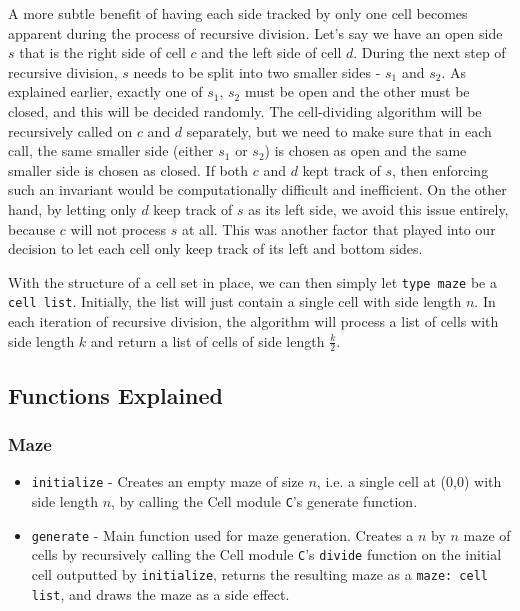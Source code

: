 \documentclass[11pt, margin=1in]{article}
\newcommand{\tab}{\par \qquad}
\begin{document}
A more subtle benefit of having each side tracked by only one cell becomes apparent during the process of recursive division.  Let's say we have an open side $s$ that is the right side of cell $c$ and the left side of cell $d$.  During the next step of recursive division, $s$ needs to be split into two smaller sides - $s_1$ and $s_2$.  As explained earlier, exactly one of $s_1$, $s_2$ must be open and the other must be closed, and this will be decided randomly.  The cell-dividing algorithm will be recursively called on $c$ and $d$ separately, but we need to make sure that in each call, the same smaller side (either $s_1$ or $s_2$) is chosen as open and the same smaller side is chosen as closed.  If both $c$ and $d$ kept track of $s$, then enforcing such an invariant would be computationally difficult and inefficient.  On the other hand, by letting only $d$ keep track of $s$ as its left side, we avoid this issue entirely, because $c$ will not process $s$ at all.  This was another factor that played into our decision to let each cell only keep track of its left and bottom sides.    

\tab With the structure of a cell set in place, we can then simply let \texttt{type maze} be a \texttt{cell list}.  Initially, the list will just contain a single cell with side length $n$.  In each iteration of recursive division, the algorithm will process a list of cells with side length $k$ and return a list of cells of side length $\frac{k}{2}$.                   
   
\subsection{Functions Explained} %

\subsubsection{Maze}
\begin{itemize}
\item \texttt{initialize} - Creates an empty maze of size $n$, i.e. a single cell at (0,0) with side length $n$, by calling the Cell module \texttt{C}'s generate function.
\item \texttt{generate} - Main function used for maze generation. Creates a $n$ by $n$ maze of cells by recursively calling the Cell module \texttt{C}'s \texttt{divide} function on the initial cell outputted by \texttt{initialize}, returns the resulting maze as a \texttt{maze: cell list}, and draws the maze as a side effect.
\end{itemize}
\end{document}
